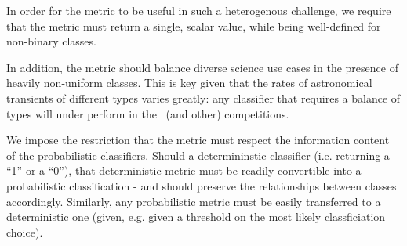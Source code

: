 In order for the metric to be useful in such a heterogenous challenge, we require that the metric must return a single, scalar value, while being well-defined for non-binary classes.

In addition, the metric should balance diverse science use cases in the presence of heavily non-uniform classes.
This is key given that the rates of astronomical transients of different types varies greatly: any classifier that requires a balance of types will under perform in the \plasticc\ (and other) competitions.

We impose the restriction that the metric must respect the information content of the probabilistic classifiers.
Should a determininstic classifier (i.e. returning a ``1'' or a ``0''), that deterministic metric must be readily convertible into a probabilistic classification - and should preserve the relationships between classes accordingly.
Similarly, any probabilistic metric must be easily transferred to a deterministic one (given, e.g. given a threshold on the most likely classficiation choice).

